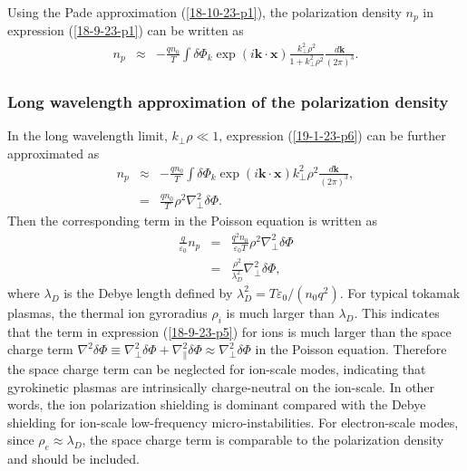 \documentclass{article}
\begin{document}
Using the Pade approximation (\ref{18-10-23-p1}), the polarization density
$n_p$ in expression (\ref{18-9-23-p1}) can be written as
\begin{eqnarray}
  n_p & \approx & - \frac{q n_0}{T} \int \delta \Phi_k \exp (i\mathbf{k} \cdot
  \mathbf{x}) \frac{k_{\perp}^2 \rho^2}{1 + k_{\perp}^2 \rho^2}
  \frac{d\mathbf{k}}{(2 \pi)^3} .  \label{19-1-23-p6}
\end{eqnarray}

\subsubsection{Long wavelength approximation of the polarization density}

In the long wavelength limit, $k_{\perp} \rho \ll 1$, expression
(\ref{19-1-23-p6}) can be further approximated as
\begin{eqnarray}
  n_p & \approx & - \frac{q n_0}{T} \int \delta \Phi_k \exp (i\mathbf{k} \cdot
  \mathbf{x}) k_{\perp}^2 \rho^2 \frac{d\mathbf{k}}{(2 \pi)^3}, \nonumber\\
  & = & \frac{q n_0}{T} \rho^2 \nabla_{\perp}^2 \delta \Phi . 
  \label{19-1-23-p5}
\end{eqnarray}
Then the corresponding term in the Poisson equation is written as
\begin{eqnarray}
  \frac{q}{\varepsilon_0} n_p & = & \frac{q^2 n_0}{\varepsilon_0 T} \rho^2
  \nabla_{\perp}^2 \delta \Phi \nonumber\\
  & = & \frac{\rho^2}{\lambda_D^2} \nabla_{\perp}^2 \delta \Phi, 
  \label{18-9-23-p5}
\end{eqnarray}
where $\lambda_D$ is the Debye length defined by $\lambda_D^2 = T
\varepsilon_0 / (n_0 q^2)$. For typical tokamak plasmas, the thermal ion
gyroradius $\rho_i$ is much larger than $\lambda_D$. This indicates that the
term in expression (\ref{18-9-23-p5}) for ions is much larger than the space
charge term $\nabla^2 \delta \Phi \equiv \nabla^2_{\perp} \delta \Phi +
\nabla^2_{\parallel} \delta \Phi \approx \nabla^2_{\perp} \delta \Phi$ in the
Poisson equation. Therefore the space charge term can be neglected for
ion-scale modes, indicating that gyrokinetic plasmas are intrinsically
charge-neutral on the ion-scale. In other words, the ion polarization
shielding is dominant compared with the Debye shielding for ion-scale
low-frequency micro-instabilities. For electron-scale modes, since $\rho_e
\approx \lambda_D$, the space charge term is comparable to the polarization
density and should be included.
\end{document}
